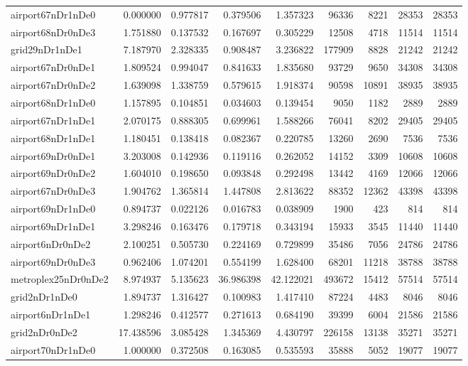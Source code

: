 \begin{longtable}{|l|r|r|r|r|r|r|r|r|}
airport67nDr1nDe0 & 0.000000 & 0.977817 & 0.379506 & 1.357323 & 96336 & 8221 & 28353 & 28353 \\
airport68nDr0nDe3 & 1.751880 & 0.137532 & 0.167697 & 0.305229 & 12508 & 4718 & 11514 & 11514 \\
grid29nDr1nDe1 & 7.187970 & 2.328335 & 0.908487 & 3.236822 & 177909 & 8828 & 21242 & 21242 \\
airport67nDr0nDe1 & 1.809524 & 0.994047 & 0.841633 & 1.835680 & 93729 & 9650 & 34308 & 34308 \\
airport67nDr0nDe2 & 1.639098 & 1.338759 & 0.579615 & 1.918374 & 90598 & 10891 & 38935 & 38935 \\
airport68nDr1nDe0 & 1.157895 & 0.104851 & 0.034603 & 0.139454 & 9050 & 1182 & 2889 & 2889 \\
airport67nDr1nDe1 & 2.070175 & 0.888305 & 0.699961 & 1.588266 & 76041 & 8202 & 29405 & 29405 \\
airport68nDr1nDe1 & 1.180451 & 0.138418 & 0.082367 & 0.220785 & 13260 & 2690 & 7536 & 7536 \\
airport69nDr0nDe1 & 3.203008 & 0.142936 & 0.119116 & 0.262052 & 14152 & 3309 & 10608 & 10608 \\
airport69nDr0nDe2 & 1.604010 & 0.198650 & 0.093848 & 0.292498 & 13442 & 4169 & 12066 & 12066 \\
airport67nDr0nDe3 & 1.904762 & 1.365814 & 1.447808 & 2.813622 & 88352 & 12362 & 43398 & 43398 \\
airport69nDr1nDe0 & 0.894737 & 0.022126 & 0.016783 & 0.038909 & 1900 & 423 & 814 & 814 \\
airport69nDr1nDe1 & 3.298246 & 0.163476 & 0.179718 & 0.343194 & 15933 & 3545 & 11440 & 11440 \\
airport6nDr0nDe2 & 2.100251 & 0.505730 & 0.224169 & 0.729899 & 35486 & 7056 & 24786 & 24786 \\
airport69nDr0nDe3 & 0.962406 & 1.074201 & 0.554199 & 1.628400 & 68201 & 11218 & 38788 & 38788 \\
metroplex25nDr0nDe2 & 8.974937 & 5.135623 & 36.986398 & 42.122021 & 493672 & 15412 & 57514 & 57514 \\
grid2nDr1nDe0 & 1.894737 & 1.316427 & 0.100983 & 1.417410 & 87224 & 4483 & 8046 & 8046 \\
airport6nDr1nDe1 & 1.298246 & 0.412577 & 0.271613 & 0.684190 & 39399 & 6004 & 21586 & 21586 \\
grid2nDr0nDe2 & 17.438596 & 3.085428 & 1.345369 & 4.430797 & 226158 & 13138 & 35271 & 35271 \\
airport70nDr1nDe0 & 1.000000 & 0.372508 & 0.163085 & 0.535593 & 35888 & 5052 & 19077 & 19077 \\

\end{longtable}
